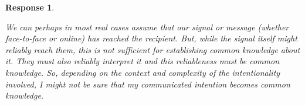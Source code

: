 \documentclass[a4paper]{article}
\newtheorem{response}{Response}
\begin{document}
\begin{response}\label{reliable_communication}

We can perhaps in most real cases assume that our signal or message (whether face-to-face or online) has reached the recipient. But, while the signal itself might reliably reach them, this is not sufficient for establishing common knowledge about it. They must also reliably interpret it \emph{and} this reliableness must be common knowledge.  So, depending on the context and complexity of the intentionality involved, I might not be sure that my communicated intention becomes common knowledge. 


\end{response}
\end{document}
